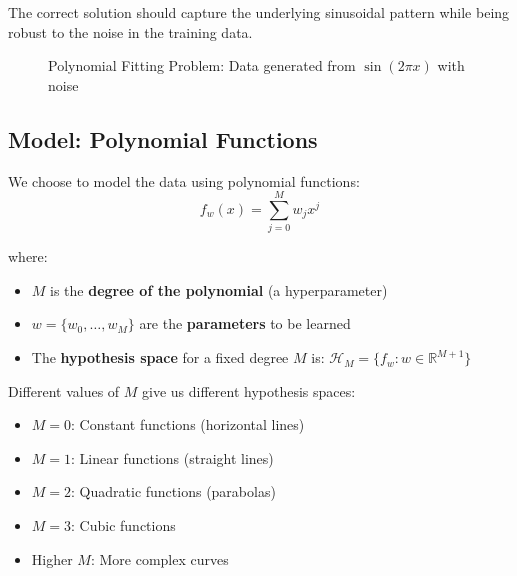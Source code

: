 \documentclass[11pt,a4paper]{article}
\theoremstyle{definition}
\theoremstyle{plain}
\theoremstyle{remark}
\begin{document}
The correct solution should capture the underlying sinusoidal pattern while being robust to the noise in the training data.

\begin{figure}[h]
\centering
{}
\caption{Polynomial Fitting Problem: Data generated from $\sin(2\pi x)$ with noise}
\end{figure}

\subsection{Model: Polynomial Functions}

\begin{tcolorbox}[colback=magenta!5!white,colframe=magenta!75!black,title=\textbf{Polynomial Model}]
We choose to model the data using polynomial functions:
\[
f_w(x) = \sum_{j=0}^{M} w_j x^j
\]

where:
\begin{itemize}
    \item $M$ is the \textbf{degree of the polynomial} (a hyperparameter)
    \item $w = \{w_0, \ldots, w_M\}$ are the \textbf{parameters} to be learned
    \item The \textbf{hypothesis space} for a fixed degree $M$ is: $\mathcal{H}_M = \{f_w : w \in \mathbb{R}^{M+1}\}$
\end{itemize}
\end{tcolorbox}

Different values of $M$ give us different hypothesis spaces:
\begin{itemize}
    \item $M = 0$: Constant functions (horizontal lines)
    \item $M = 1$: Linear functions (straight lines)
    \item $M = 2$: Quadratic functions (parabolas)
    \item $M = 3$: Cubic functions
    \item Higher $M$: More complex curves
\end{itemize}
\end{document}
